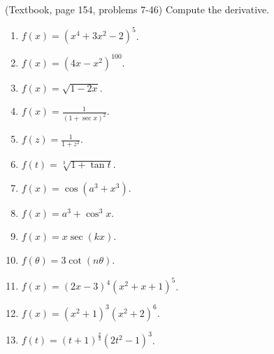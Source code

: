 \begin{problem}(Textbook, page 154, problems 7-46) Compute the derivative.
\begin{multicols}{2}
\begin{enumerate}
\item $\displaystyle f(x)= (x^4+3x^2-2)^5$.

\item $\displaystyle f(x)= (4x-x^2)^{100}$.

\item $\displaystyle f(x)= \sqrt{1-2x}$.

\item $\displaystyle f(x)= \frac{1}{(1+\sec x)^2}$.

\item $\displaystyle f(z)=\frac{1}{1+z^2} $.

\item $\displaystyle f(t)= \sqrt[3]{1+\tan t}$.

\item $\displaystyle f(x)=\cos (a^3+x^3) $.

\item $\displaystyle f(x)= a^3+\cos^3 x$.

\item $\displaystyle f(x)= x\sec (k x) $.

\item $\displaystyle f(\theta)= 3\cot (n\theta)$.

\item $\displaystyle f(x)= (2x - 3)^4 (x^2 + x + 1)^5$.

\item $\displaystyle f(x)= (x^2+1)^3(x^2+2)^6$.

\item $\displaystyle f(t)= (t+1)^{\frac{2}{3}}(2t^2-1)^3$.


\end{enumerate}
\end{multicols}
\end{problem}
